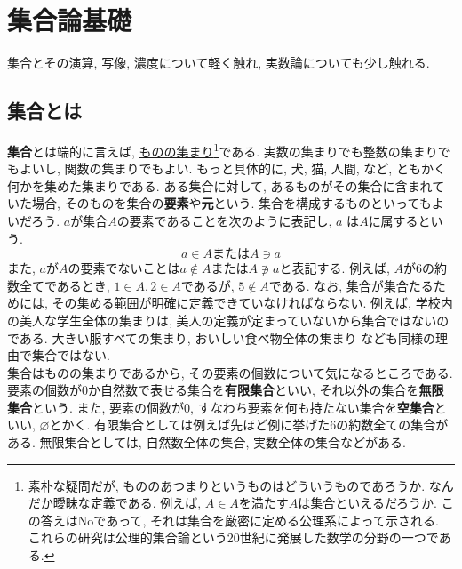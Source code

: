 \documentclass[a4j,dvipdfmx]{jsarticle}
\numberwithin{equation}{section}
\begin{document}
    \section{集合論基礎}
        集合とその演算, 写像, 濃度について軽く触れ, 実数論についても少し触れる.
        \subsection{集合とは}
            \textbf{集合}とは端的に言えば, \underline{ものの集まり}\footnote{素朴な疑問だが, もののあつまりというものはどういうものであろうか. なんだか曖昧な定義である. 例えば, $A\in A$を満たす$A$は集合といえるだろうか.
             この答えはNoであって, それは集合を厳密に定める公理系によって示される. これらの研究は公理的集合論という20世紀に発展した数学の分野の一つである.}である. 実数の集まりでも整数の集まりでもよいし, 関数の集まりでもよい.
            もっと具体的に, 犬, 猫, 人間, など, ともかく何かを集めた集まりである. ある集合に対して, あるものがその集合に含まれていた場合, 
            そのものを集合の\textbf{要素}や\textbf{元}という. 集合を構成するものといってもよいだろう. $a$が集合$A$の要素であることを次のように表記し, $a$
            は$A$に属するという.
            \begin{equation}
                a \in A \text{または} A \ni a \label{eq:集合論基礎:元の表記}
            \end{equation}
            また, $a$が$A$の要素でないことは$a\not\in A$または$A \not\ni a$と表記する. 例えば, $A$が6の約数全てであるとき, 
            $1\in A,2\in A$であるが, $5\not\in A$である. なお, 集合が集合たるためには, その集める範囲が明確に定義できていなければならない.
            例えば, 学校内の美人な学生全体の集まりは, 美人の定義が定まっていないから集合ではないのである. 大きい服すべての集まり, おいしい食べ物全体の集まり
            なども同様の理由で集合ではない. \\
        
            集合はものの集まりであるから, その要素の個数について気になるところである. 要素の個数が0か自然数で表せる集合を\textbf{有限集合}といい, 
            それ以外の集合を\textbf{無限集合}という. また, 要素の個数が0, すなわち要素を何も持たない集合を\textbf{空集合}といい, $\varnothing$とかく.
            有限集合としては例えば先ほど例に挙げた6の約数全ての集合がある. 無限集合としては, 自然数全体の集合, 実数全体の集合などがある.
\end{document}

